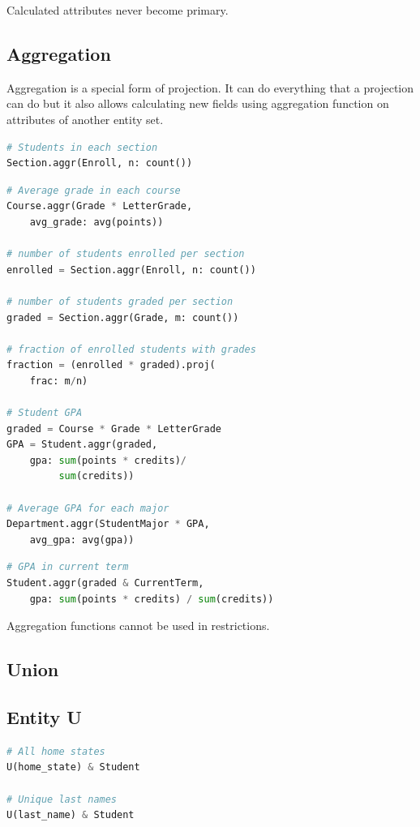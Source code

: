 \documentclass[letter,10pt]{article}
\begin{document}
Calculated attributes never become primary.

\subsection{Aggregation}\label{sec:aggr}
Aggregation is a special form of projection. 
It can do everything that a projection can do but it also allows calculating new fields using aggregation function on attributes of another entity set. 
\begin{lstlisting}[language=Python, caption={Calculate summary statistics.}, label={lst:aggr1}]
# Students in each section
Section.aggr(Enroll, n: count())
\end{lstlisting}

\begin{lstlisting}[language=Python, caption={Aggregation in expressions.}, label={lst:aggr2}]
# Average grade in each course
Course.aggr(Grade * LetterGrade, 
    avg_grade: avg(points))

# number of students enrolled per section
enrolled = Section.aggr(Enroll, n: count())

# number of students graded per section
graded = Section.aggr(Grade, m: count())

# fraction of enrolled students with grades
fraction = (enrolled * graded).proj(
    frac: m/n)

# Student GPA
graded = Course * Grade * LetterGrade
GPA = Student.aggr(graded,
    gpa: sum(points * credits)/
         sum(credits))

# Average GPA for each major
Department.aggr(StudentMajor * GPA, 
    avg_gpa: avg(gpa))
\end{lstlisting}

\begin{lstlisting}[language=Python, caption={Reuse of variables}, label={lst:aggr3}]
# GPA in current term
Student.aggr(graded & CurrentTerm, 
    gpa: sum(points * credits) / sum(credits))
\end{lstlisting}

Aggregation functions cannot be used in restrictions. 

\subsection{Union}\label{sec:union}

\subsection{Entity U}\label{sec:u}
\begin{lstlisting}[language=Python, morekeywords={avg, U}, caption={Creating a new entity.}, label={lst:u1}]
# All home states
U(home_state) & Student

# Unique last names
U(last_name) & Student 
\end{lstlisting}
\end{document}
